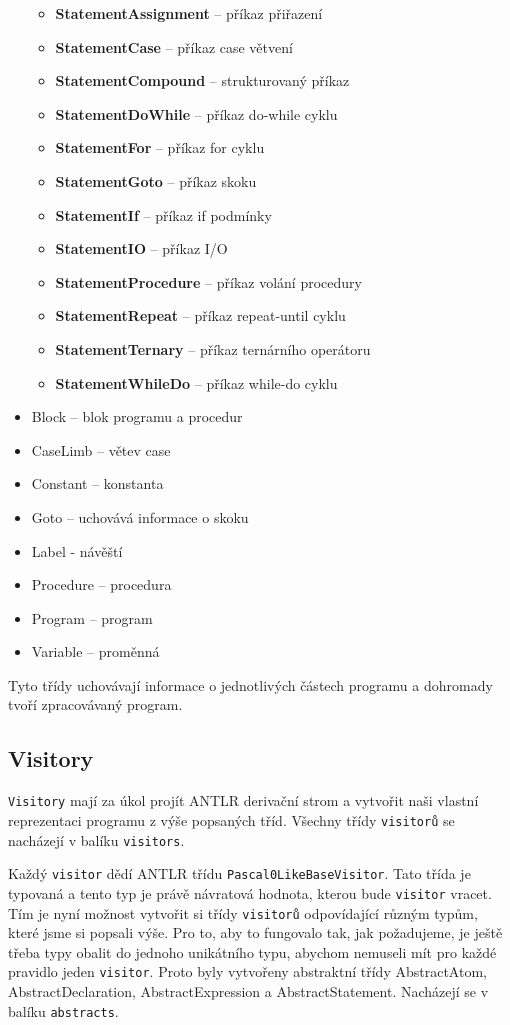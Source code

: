 \documentclass[
12pt,
a4paper,
pdftex,
czech,
titlepage
]{report}
\begin{document}
\begin{itemize}
	 \begin{itemize}
	 \item \textbf{StatementAssignment} -- příkaz přiřazení
	 \item \textbf{StatementCase} -- příkaz case větvení
	 \item \textbf{StatementCompound} -- strukturovaný příkaz
	 \item \textbf{StatementDoWhile} -- příkaz do-while cyklu
	 \item \textbf{StatementFor} -- příkaz for cyklu
	 \item \textbf{StatementGoto} -- příkaz skoku
	 \item \textbf{StatementIf} -- příkaz if podmínky
	 \item \textbf{StatementIO} -- příkaz I/O
	 \item \textbf{StatementProcedure} -- příkaz volání procedury
	 \item \textbf{StatementRepeat} -- příkaz repeat-until cyklu
	 \item \textbf{StatementTernary} -- příkaz ternárního operátoru
	 \item \textbf{StatementWhileDo} -- příkaz while-do cyklu
	 \end{itemize}
\item Block -- blok programu a procedur
\item CaseLimb -- větev case
\item Constant -- konstanta
\item Goto -- uchovává informace o skoku
\item Label - návěští
\item Procedure -- procedura
\item Program -- program
\item Variable -- proměnná	 
\end{itemize}
 
	Tyto třídy uchovávají informace o jednotlivých částech programu a dohromady tvoří zpracovávaný program.
 
\subsection{Visitory}

	\texttt{Visitory} mají za úkol projít ANTLR derivační strom a vytvořit naši vlastní reprezentaci programu z výše popsaných tříd. Všechny třídy \texttt{visitorů} se nacházejí v balíku \texttt{visitors}.
	
	Každý \texttt{visitor} dědí ANTLR třídu \texttt{Pascal0LikeBaseVisitor}. Tato třída je typovaná a tento typ je právě návratová hodnota, kterou bude \texttt{visitor} vracet. Tím je nyní možnost vytvořit si třídy \texttt{visitorů} odpovídající různým typům, které jsme si popsali výše. Pro to, aby to fungovalo tak, jak požadujeme, je ještě třeba typy obalit do jednoho unikátního typu, abychom nemuseli mít pro každé pravidlo jeden \texttt{visitor}. Proto byly vytvořeny abstraktní třídy AbstractAtom, AbstractDeclaration, AbstractExpression a AbstractStatement. Nacházejí se v balíku \texttt{abstracts}.
	 
\end{document}
